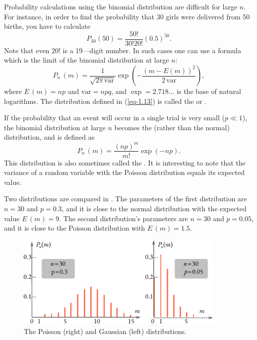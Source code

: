  Probability calculations using the
binomial distribution are difficult for large $n$. For instance, in order to
find the probability that 30 girls were delivered from 50 births, you have
to calculate
\begin{equation*}
P_{30}(50) = \frac{50!}{30!20!} (0.5)^{50}.
\end{equation*}
Note that even $20!$ is a 19—digit number. In such cases one can use a
formula which is the limit of the binomial distribution at large $n$:
\begin{equation}%
P_{n}\,(m) = \frac{1}{\sqrt{2 \pi \, \textrm{var}}} \exp \left( -  \frac{(m - E(m))^{2}}{2 \, \textrm{var}}  \right),
\label{eq-1.13}
\end{equation}
where $E\,(m) = np$ and $\textrm{var} = npq$, and $\exp = 2.718 \ldots$
is the base of natural logarithms. The distribution deﬁned in
(\ref{eq-1.13}) is called the  or .


 If the probability that an event will
occur in a single trial is very small ($p \ll1$), the binomial distribution at
large $n$  becomes the  (rather than the normal) distribution, and is deﬁned as
\begin{equation}%
P_{n}\,(m) = \frac{(np)^{m}}{m!} \exp (-np).
\label{eq-1.14}
\end{equation}
This distribution is also sometimes called the . It is
interesting to note that the variance of a random variable with
the Poisson distribution equals its expected value.

Two distributions are compared in . The parameters of the
first distribution are $n = 30$ and $p = 0.3$, and it is close to the normal
distribution with the expected value $E\, (m) = 9$. The second distribution’s
parameters are $n = 30$ and $p = 0.05$, and it is close to the Poisson
distribution with $E\,(m)= 1.5$.

\begin{figure}[!h]
 \centering
 \includegraphics[width=0.9\textwidth]{figures/poisson-gaussian.pdf}
\caption{The Poisson (right) and Gaussian (left) distributions.
\label{poisson-gaussian}}
 \end{figure}

